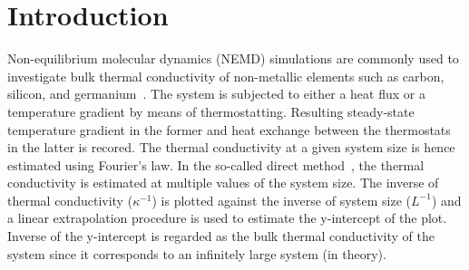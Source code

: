 \section{Introduction}
\label{sec:intro}


Non-equilibrium molecular dynamics (NEMD) simulations are commonly used to investigate
bulk thermal conductivity of non-metallic elements such as carbon, silicon, and
germanium~\cite{Dumitrica:2010}. The system is subjected to either a heat flux or a temperature
gradient by means of thermostatting. Resulting steady-state temperature gradient in the
former and heat exchange between the thermostats in the latter is recored. The thermal
conductivity at a given system size is hence estimated using Fourier's law. In the
so-called direct method~\cite{Schelling:2002,Turney:2009,Zhou:2009,Landry:2009,
McGaughey:2006,Ni:2009,Shi:2009,Wang:2009,Papanikolaou:2008},
the thermal conductivity is estimated at multiple values of the
system size. The inverse of thermal conductivity ($\kappa^{-1}$) is plotted against the inverse of 
system size ($L^{-1}$) and a linear extrapolation procedure is used to estimate the y-intercept
of the plot. Inverse of the y-intercept is regarded as the bulk thermal conductivity
of the system since it corresponds to an infinitely large system (in theory). 

